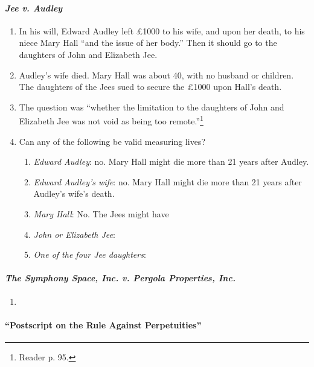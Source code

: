\paragraph{\emph{Jee v. Audley}}


\begin{enumerate}
    \item In his will, Edward Audley left \pounds 1000 to his wife, and upon 
    her death, to his niece Mary Hall ``and the issue of her body.'' Then it 
    should go to the daughters of John and Elizabeth Jee.
    \item Audley's wife died. Mary Hall was about 40, with no husband or 
    children. The daughters of the Jees sued to secure the \pounds 1000 upon 
    Hall's death.
    \item The question was ``whether the limitation to the daughters of John 
    and Elizabeth Jee was not void as being too remote.''\footnote{Reader p. 
    95.}
    \item Can any of the following be valid measuring lives?
    \begin{enumerate}
        \item \emph{Edward Audley}: no. Mary Hall might die more than 21 years 
        after Audley.
        \item \emph{Edward Audley's wife}: no. Mary Hall might die more than 
        21 years after Audley's wife's death.
        \item \emph{Mary Hall}: No. The Jees might have 
        \item \emph{John or Elizabeth Jee}:
        \item \emph{One of the four Jee daughters}:
    \end{enumerate}
\end{enumerate}

\paragraph{\emph{The Symphony Space, Inc. v. Pergola Properties, Inc.}}

\begin{enumerate}
    \item %
\end{enumerate}

\paragraph{``Postscript on the Rule Against Perpetuities''}

